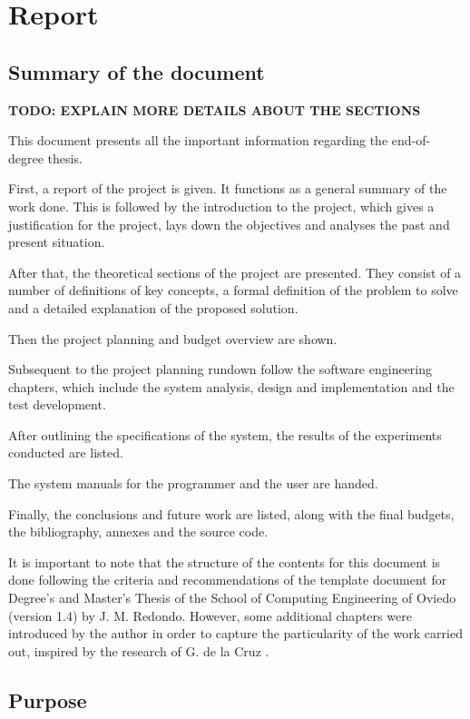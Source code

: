 \renewcommand{\documentname}{Report}

\chapter{Report}

\section{Summary of the document}

\textbf{TODO: EXPLAIN MORE DETAILS ABOUT THE SECTIONS}

This document presents all the important information regarding the \textit{\tfg} end-of-degree thesis.

First, a report of the project is given. It functions as a general summary of the work done. This is followed by the introduction to the project, which gives a justification for the project, lays down the objectives and analyses the past and present situation.

After that, the theoretical sections of the project are presented. They consist of a number of definitions of key concepts, a formal definition of the problem to solve and a detailed explanation of the proposed solution.

Then the project planning and budget overview are shown.

Subsequent to the project planning rundown follow the software engineering chapters, which include the system analysis, design and implementation and the test development. 

After outlining the specifications of the system, the results of the experiments conducted are listed.

The system manuals for the programmer and the user are handed.

Finally, the conclusions and future work are listed, along with the final budgets, the bibliography, annexes and the source code.

It is important to note that the structure of the contents for this document is done following the criteria and recommendations of the template document for Degree's and Master's Thesis of the School of Computing Engineering of Oviedo (version 1.4) \cite{doc-template} by J. M. Redondo. However, some additional chapters were introduced by the author in order to capture the particularity of the work carried out, inspired by the research of G. de la Cruz \cite{metaheuristics-groups}.


\section{Purpose}\label{purpose}

